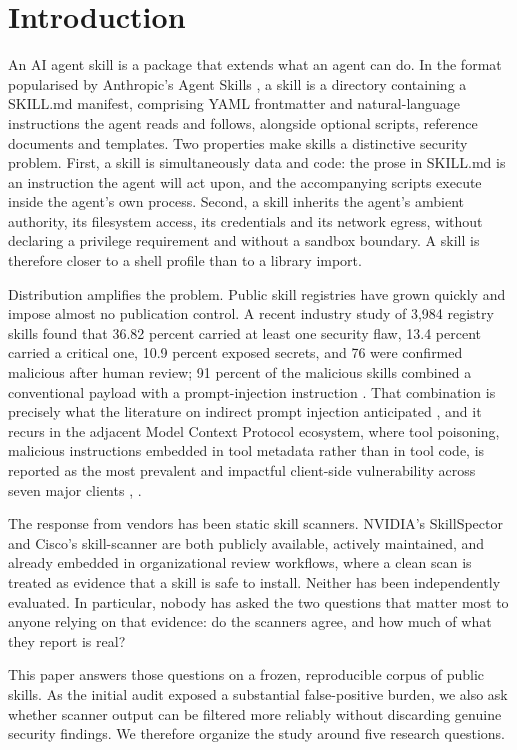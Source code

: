 \documentclass[conference]{IEEEtran}
\begin{document}
\section{Introduction}

An AI agent skill is a package that extends what an agent can do. In the format popularised by Anthropic's Agent Skills \cite{ref1}, a skill is a directory containing a SKILL.md manifest, comprising YAML frontmatter and natural-language instructions the agent reads and follows, alongside optional scripts, reference documents and templates. Two properties make skills a distinctive security problem. First, a skill is simultaneously data and code: the prose in SKILL.md is an instruction the agent will act upon, and the accompanying scripts execute inside the agent's own process. Second, a skill inherits the agent's ambient authority, its filesystem access, its credentials and its network egress, without declaring a privilege requirement and without a sandbox boundary. A skill is therefore closer to a shell profile than to a library import.

Distribution amplifies the problem. Public skill registries have grown quickly and impose almost no publication control. A recent industry study of 3,984 registry skills found that 36.82 percent carried at least one security flaw, 13.4 percent carried a critical one, 10.9 percent exposed secrets, and 76 were confirmed malicious after human review; 91 percent of the malicious skills combined a conventional payload with a prompt-injection instruction \cite{ref5}. That combination is precisely what the literature on indirect prompt injection anticipated \cite{ref2}, and it recurs in the adjacent Model Context Protocol ecosystem, where tool poisoning, malicious instructions embedded in tool metadata rather than in tool code, is reported as the most prevalent and impactful client-side vulnerability across seven major clients \cite{ref3}, \cite{ref4}.

The response from vendors has been static skill scanners. NVIDIA's SkillSpector \cite{ref6} and Cisco's skill-scanner \cite{ref7} are both publicly available, actively maintained, and already embedded in organizational review workflows, where a clean scan is treated as evidence that a skill is safe to install. Neither has been independently evaluated. In particular, nobody has asked the two questions that matter most to anyone relying on that evidence: do the scanners agree, and how much of what they report is real?

This paper answers those questions on a frozen, reproducible corpus of public skills. As the initial audit exposed a substantial false-positive burden, we also ask whether scanner output can be filtered more reliably without discarding genuine security findings. We therefore organize the study around five research questions.
\end{document}
